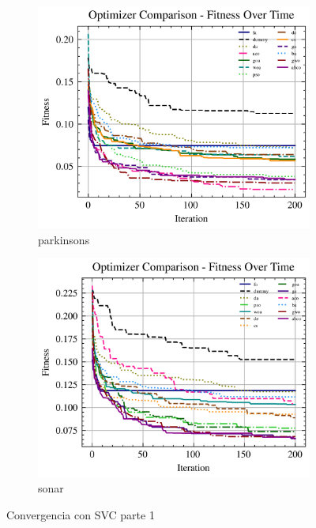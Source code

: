 \begin{figure}[htb]
    \begin{subfigure}[b]{0.45\textwidth}
        \includegraphics[width=\textwidth]{imagenes/fitness_charts/img/binary/parkinsons/optimizers_fitness_svc.png}
        \caption{parkinsons}
        \label{fig:convergencia_parkinsons_svc}
    \end{subfigure}
    \begin{subfigure}[b]{0.45\textwidth}
        \includegraphics[width=\textwidth]{imagenes/fitness_charts/img/binary/sonar/optimizers_fitness_svc.png}
        \caption{sonar}
        \label{fig:convergencia_sonar_svc}
    \end{subfigure}
    \caption{Convergencia con SVC parte 1}
    \label{fig:convergencia_svc_1}
\end{figure}

